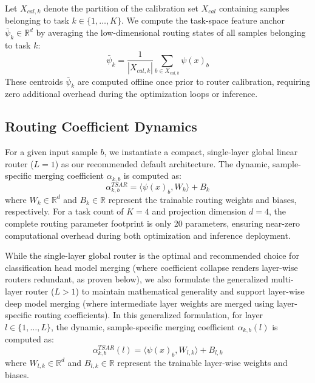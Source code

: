 Let $X_{cal, k}$ denote the partition of the calibration set $X_{cal}$ containing samples belonging
to task $k \in \{1, \dots, K\}$. We compute the task-space feature anchor $\bar{\psi}_k \in
\mathbb{R}^d$ by averaging the low-dimensional routing states of all samples belonging to task $k$:
\begin{equation}
\bar{\psi}_k = \frac{1}{|X_{cal, k}|} \sum_{b \in X_{cal, k}} \psi(x)_b
\label{eq:anchor_mean}
\end{equation}
These centroids $\bar{\psi}_k$ are computed offline once prior to router calibration, requiring
zero additional overhead during the optimization loops or inference.

\subsection{Routing Coefficient Dynamics}
For a given input sample $b$, we instantiate a compact, single-layer global linear router ($L=1$) as our recommended default architecture. The dynamic, sample-specific merging coefficient $\alpha_{k, b}$ is computed as:
\begin{equation}
\alpha_{k, b}^{TSAR} = \langle \psi(x)_b, W_{k} \rangle + B_{k}
\label{eq:router_coeffs_l1}
\end{equation}
where $W_{k} \in \mathbb{R}^d$ and $B_{k} \in \mathbb{R}$ represent the trainable routing weights and biases, respectively. For a task count of $K=4$ and projection dimension $d=4$, the complete routing parameter footprint is only 20 parameters, ensuring near-zero computational overhead during both optimization and inference deployment.

While the single-layer global router is the optimal and recommended choice for classification head model merging (where coefficient collapse renders layer-wise routers redundant, as proven below), we also formulate the generalized multi-layer router ($L > 1$) to maintain mathematical generality and support layer-wise deep model merging (where intermediate layer weights are merged using layer-specific routing coefficients). In this generalized formulation, for layer $l \in \{1, \dots, L\}$, the dynamic, sample-specific merging coefficient $\alpha_{k, b}(l)$ is computed as:
\begin{equation}
\alpha_{k, b}^{TSAR}(l) = \langle \psi(x)_b, W_{l, k} \rangle + B_{l, k}
\label{eq:router_coeffs}
\end{equation}
where $W_{l, k} \in \mathbb{R}^d$ and $B_{l, k} \in \mathbb{R}$ represent the trainable layer-wise weights and biases.

